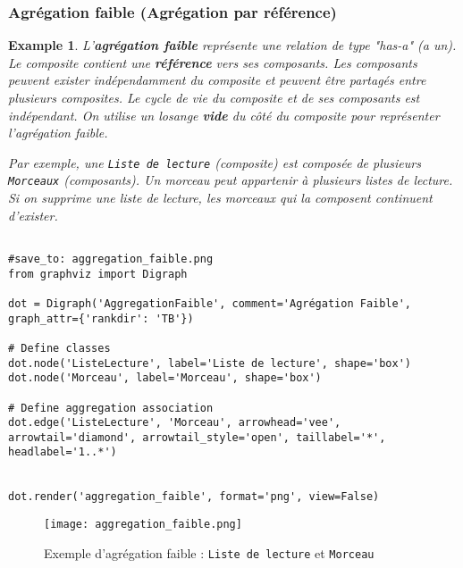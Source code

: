 \documentclass{article}
\newtheorem{example}{Example}
\begin{document}
\subsubsection{Agrégation faible (Agrégation par référence)}
\begin{example}
L'\textbf{agrégation faible} représente une relation de type "has-a" (a un). Le composite contient une \textbf{référence} vers ses composants. Les composants peuvent exister indépendamment du composite et peuvent être partagés entre plusieurs composites. Le cycle de vie du composite et de ses composants est indépendant.  On utilise un losange \textbf{vide} du côté du composite pour représenter l'agrégation faible.

Par exemple, une \texttt{Liste de lecture} (composite) est composée de plusieurs \texttt{Morceaux} (composants).  Un morceau peut appartenir à plusieurs listes de lecture. Si on supprime une liste de lecture, les morceaux qui la composent continuent d'exister.
\end{example}

\begin{verbatim}

#save_to: aggregation_faible.png
from graphviz import Digraph

dot = Digraph('AggregationFaible', comment='Agrégation Faible', graph_attr={'rankdir': 'TB'})

# Define classes
dot.node('ListeLecture', label='Liste de lecture', shape='box')
dot.node('Morceau', label='Morceau', shape='box')

# Define aggregation association
dot.edge('ListeLecture', 'Morceau', arrowhead='vee', arrowtail='diamond', arrowtail_style='open', taillabel='*', headlabel='1..*')


dot.render('aggregation_faible', format='png', view=False)
\end{verbatim}

\begin{figure}[h]
    \centering
    \texttt{[image: aggregation\_faible.png]}
    \caption{Exemple d'agrégation faible : \texttt{Liste de lecture} et \texttt{Morceau}}
    \label{fig:aggregation_faible}
\end{figure}
\end{document}
